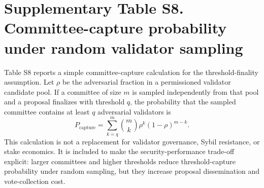 \documentclass[12pt]{article}
\begin{document}
\begin{table}[h]
\centering
\caption*{S7. Collusive-direction malicious-ratio sensitivity on Fashion-MNIST Non-IID. Values are mean $\pm$ standard deviation over three seeds; higher clean accuracy and lower ASR/loss are better.}
\end{table}

\clearpage
\section*{Supplementary Table S8. Committee-capture probability under random validator sampling}

Table S8 reports a simple committee-capture calculation for the threshold-finality assumption. Let $\rho$ be the adversarial fraction in a permissioned validator candidate pool. If a committee of size $m$ is sampled independently from that pool and a proposal finalizes with threshold $q$, the probability that the sampled committee contains at least $q$ adversarial validators is
\[
P_{\mathrm{capture}}=\sum_{k=q}^{m}\binom{m}{k}\rho^k(1-\rho)^{m-k}.
\]
This calculation is not a replacement for validator governance, Sybil resistance, or stake economics. It is included to make the security-performance trade-off explicit: larger committees and higher thresholds reduce threshold-capture probability under random sampling, but they increase proposal dissemination and vote-collection cost.
\end{document}
